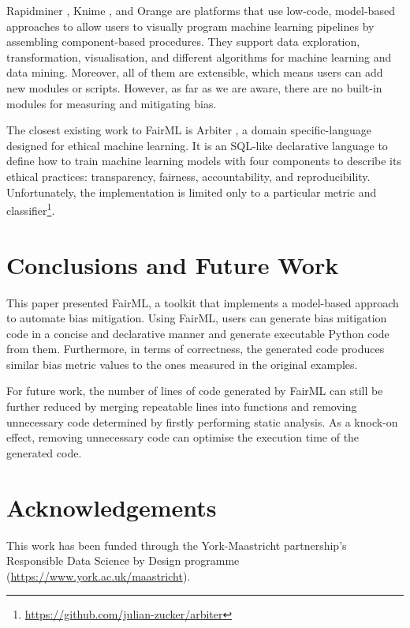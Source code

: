 \documentclass[sigconf]{acmart}
\begin{document}
{	Rapidminer \cite{hofmann2016rapidminer}, Knime \cite{berthold2008knime}, and Orange \cite{demsar2013orange} are platforms that use low-code, model-based approaches to allow users to visually program machine learning pipelines by assembling component-based procedures. They support data exploration, transformation, visualisation, and different algorithms for machine learning and data mining. Moreover, all of them are extensible, which means users can add new modules or scripts. However, as far as we are aware, there are no built-in modules for measuring and mitigating bias. 
	
	The closest existing work to FairML is Arbiter \cite{zucker2020arbiter}, a domain specific-language designed for ethical machine learning. It is an SQL-like declarative language to define how to train machine learning models with four components to describe its ethical practices: transparency, fairness, accountability, and reproducibility. Unfortunately, the implementation is limited only to a particular metric and classifier\footnote{\url{https://github.com/julian-zucker/arbiter}}.
	
	\section{Conclusions and Future Work}
	\label{sec:conclusions_and_future_work}
	This paper presented FairML, a toolkit that implements a model-based approach to automate bias mitigation. Using FairML, users can generate bias mitigation code in a concise and declarative manner and generate executable Python code from them. Furthermore, in terms of correctness, the generated code produces similar bias metric values to the ones measured in the original examples.
	
	For future work, the number of lines of code generated by FairML can still be further reduced by merging repeatable lines into functions and removing unnecessary code determined by firstly performing static analysis. 
	As a knock-on effect, removing unnecessary code can optimise the execution time of the generated code.
	
	\section{Acknowledgements}
	\label{sec:acknowledgements}
	This work has been funded through the York-Maastricht
	partnership's Responsible Data Science by Design programme
	(\url{https://www.york.ac.uk/maastricht}).
	
}
\end{document}
